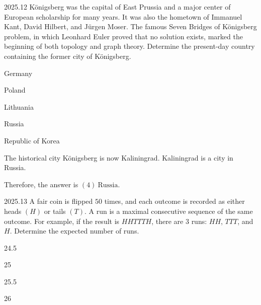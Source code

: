     \begin{pastproblem}{2025.12}
        K\"onigsberg was the capital of East Prussia and a major center of European scholarship for
        many years. It was also the hometown of Immanuel Kant, David Hilbert, and J\"urgen Moser.
        The famous Seven Bridges of K\"onigsberg problem, in which Leonhard Euler proved that no
        solution exists, marked the beginning of both topology and graph theory. Determine the
        present-day country containing the former city of K\"onigsberg.
        \begin{problemchoices}
            \item Germany
            \item Poland
            \item Lithuania
            \item Russia
            \item Republic of Korea
        \end{problemchoices}
    \end{pastproblem}

    \begin{solution}
        The historical city K\"onigsberg is now Kaliningrad. Kaliningrad is a city in Russia.

        Therefore, the answer is $\boxed{(4)\ \text{Russia}}$.
    \end{solution}

    \begin{pastproblem}{2025.13}
        A fair coin is flipped $50$ times, and each outcome is recorded as either heads $(H)$ or
        tails $(T)$. A run is a maximal consecutive sequence of the same outcome. For example, if the
        result is
        $HHTTTH$, there are $3$ runs: $HH$, $TTT$, and $H$. Determine the expected number of runs.
        \begin{problemchoices}
            \item 24.5
            \item 25
            \item 25.5
            \item 26
        \end{problemchoices}
    \end{pastproblem}

